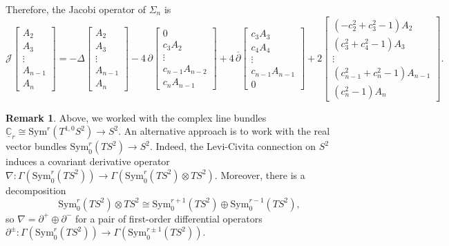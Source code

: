 \documentclass[11pt]{article}
\newcommand{\Sym}{\mathrm{Sym}}
\newcommand{\uC}{\underline{\mathbb{C}}}
\theoremstyle{definition}
\newtheorem{rmk}[thm]{Remark}
\numberwithin{equation}{section}
\begin{document}
\noindent Therefore, the Jacobi operator of $\Sigma_n$ is
\begin{equation} \label{eq:Jacobi-operator}
    \mathscr{J} \begin{bmatrix}
            A_2 \\
            A_3 \\
            \vdots \\
            A_{n-1} \\
            A_{n}
        \end{bmatrix} = - \Delta \begin{bmatrix}
            A_2 \\
            A_3 \\
            \vdots \\
            A_{n-1} \\
            A_{n}
        \end{bmatrix} - 4 \, \partial \begin{bmatrix}
            0 \\
            c_3 A_2 \\
            \vdots \\
            c_{n-1} A_{n-2} \\
            c_{n} A_{n-1}
        \end{bmatrix} + 4 \, \overline{\partial} \begin{bmatrix}
            c_3 A_3 \\
            c_4 A_4 \\
            \vdots \\
            c_{n-1} A_{n-1} \\
            0
        \end{bmatrix} + 2 \begin{bmatrix}
            (-c_2^2 + c_3^2 - 1) A_2 \\
            (c_3^2 + c_4^2 - 1) A_3 \\
            \vdots \\
            (c_{n-1}^2+c_n^2 - 1) A_{n-1} \\
            (c_n^2 - 1) A_n
        \end{bmatrix}\!.
\end{equation}

\begin{rmk} Above, we worked with the complex line bundles $\uC_r \cong \Sym^r(T^{1,0}S^2) \to S^2$.  An alternative approach is to work with the real vector bundles $\Sym^r_0(TS^2) \to S^2$.  Indeed, the Levi-Civita connection on $S^2$ induces a covariant derivative operator $\nabla \colon \Gamma(\Sym^r_0(TS^2)) \to \Gamma( \Sym^r_0(TS^2) \otimes TS^2)$.  Moreover, there is a decomposition
$$\Sym^r_0(TS^2) \otimes TS^2 \cong \Sym^{r+1}_0(TS^2) \oplus \Sym^{r-1}_0(TS^2),$$
so $\nabla = \partial^+ \oplus \partial^-$ for a pair of first-order differential operators $\partial^{\pm} \colon \Gamma(\Sym^r_0(TS^2)) \to \Gamma(\Sym^{r \pm 1}_0(TS^2))$.
\end{rmk}
\end{document}
